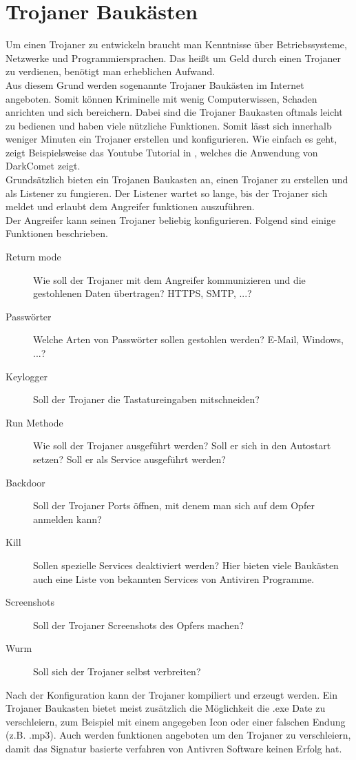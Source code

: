\section{Trojaner Baukästen}\label{sec:trojanerBaukaesten}
Um einen Trojaner zu entwickeln braucht man Kenntnisse über Betriebssysteme, Netzwerke und Programmiersprachen.
Das heißt um Geld durch einen Trojaner zu verdienen, benötigt man erheblichen Aufwand.\\
Aus diesem Grund werden sogenannte Trojaner Baukästen im Internet angeboten. Somit können Kriminelle mit wenig Computerwissen, Schaden anrichten und sich bereichern. Dabei sind die Trojaner Baukasten oftmals leicht zu bedienen und haben viele nützliche Funktionen. Somit lässt sich innerhalb weniger Minuten ein Trojaner erstellen und konfigurieren. Wie einfach es geht, zeigt Beispielsweise das Youtube Tutorial in \cite{YOUTUBE}, welches die Anwendung von DarkComet zeigt.\\
Grundsätzlich bieten ein Trojanen Baukasten an, einen Trojaner zu erstellen und als Listener zu fungieren. Der Listener wartet so lange, bis der Trojaner sich meldet und erlaubt dem Angreifer funktionen auszuführen.\\
Der Angreifer kann seinen Trojaner beliebig konfigurieren. Folgend sind einige Funktionen beschrieben.\cite{PANDA}
\begin{description}
\item[Return mode] Wie soll der Trojaner mit dem Angreifer kommunizieren und die gestohlenen Daten übertragen? HTTPS, SMTP, ...?
\item[Passwörter] Welche Arten von Passwörter sollen gestohlen werden? E-Mail, Windows, ...?
\item[Keylogger] Soll der Trojaner die Tastatureingaben mitschneiden?
\item[Run Methode] Wie soll der Trojaner ausgeführt werden? Soll er sich in den Autostart setzen? Soll er als Service ausgeführt werden?
\item[Backdoor] Soll der Trojaner Ports öffnen, mit denem man sich auf dem Opfer anmelden kann?
\item[Kill] Sollen spezielle Services deaktiviert werden? Hier bieten viele Baukästen auch eine Liste von bekannten Services von Antiviren Programme.
\item[Screenshots] Soll der Trojaner Screenshots des Opfers machen?
\item[Wurm] Soll sich der Trojaner selbst verbreiten?
\end{description}
Nach der Konfiguration kann der Trojaner kompiliert und erzeugt werden. Ein Trojaner Baukasten bietet meist zusätzlich die Möglichkeit die .exe Date zu verschleiern, zum Beispiel mit einem angegeben Icon oder einer falschen Endung (z.B. .mp3). Auch werden funktionen angeboten um den Trojaner zu verschleiern, damit das Signatur basierte verfahren von Antivren Software keinen Erfolg hat.\\
